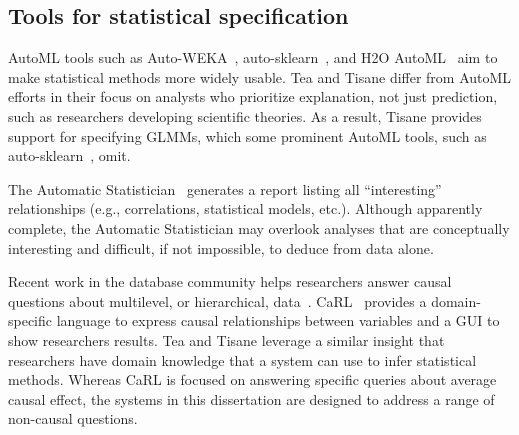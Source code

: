 \subsection{Tools for statistical specification}
AutoML tools such as
Auto-WEKA~\cite{autoweka}, auto-sklearn~\cite{autosklearn}, and H2O
AutoML~\cite{H2OAutoML20} aim to make statistical methods more widely usable.
Tea and Tisane differ from AutoML efforts in their focus on analysts who
prioritize explanation, not just prediction, such as researchers developing
scientific theories. As a result, Tisane provides support for specifying GLMMs,
which some prominent AutoML tools, such as auto-sklearn~\cite{autosklearn},
omit. 

The Automatic Statistician~\cite{lloyd2014automatic} generates a report listing
all ``interesting'' relationships (e.g., correlations, statistical models,
etc.). %
Although apparently complete, the Automatic Statistician may overlook analyses
that are conceptually interesting and difficult, if not impossible, to deduce
from data alone.

Recent work in the database community helps researchers answer causal questions
about multilevel, or hierarchical, data~\cite{salimi2020causal, kayali2020demonstration}.
CaRL~\cite{salimi2020causal} provides a domain-specific language to express
causal relationships between variables and a GUI to show researchers %
results. Tea and Tisane leverage a similar insight that researchers have domain
knowledge that a system can use to infer statistical methods. Whereas CaRL is
focused on answering specific queries about average causal effect, the systems
in this dissertation are designed to address a range of non-causal questions.


